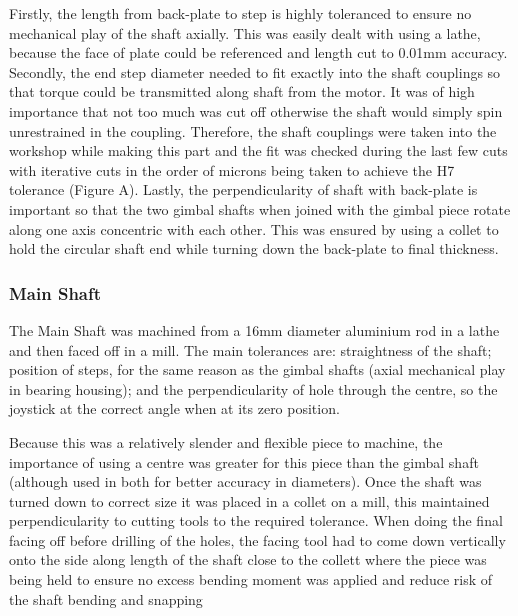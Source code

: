 Firstly, the length from back-plate to step is highly toleranced to ensure no mechanical play of the shaft axially. This was easily dealt with using a lathe, because the face of plate could be referenced and length cut to 0.01mm accuracy.  Secondly, the end step diameter needed to fit exactly into the shaft couplings so that torque could be transmitted along shaft from the motor. It was of high importance that not too much was cut off otherwise the shaft would simply spin unrestrained in the coupling. Therefore, the shaft couplings were taken into the workshop while making this part and the fit was checked during the last few cuts with iterative cuts in the order of microns being taken to achieve the H7 tolerance (Figure A). Lastly, the perpendicularity of shaft with back-plate is important so that the two gimbal shafts when joined with the gimbal piece rotate along one axis concentric with each other. This was ensured by using a collet to hold the circular shaft end while turning down the back-plate to final thickness.

\begin{figure}

\end{figure}


\subsubsection{Main Shaft} %
\label{par:main_shaft}

The Main Shaft was machined from a 16mm diameter aluminium rod in a lathe and then faced off in a mill. The main tolerances are: straightness of the shaft; position of steps, for the same reason as the gimbal shafts (axial mechanical play in bearing housing); and the perpendicularity of hole through the centre, so the joystick at the correct angle when at its zero position.

Because this was a relatively slender and flexible piece to machine, the importance of using a centre was greater for this piece than the gimbal shaft (although used in both for better accuracy in diameters). Once the shaft was turned down to correct size it was placed in a collet on a mill, this maintained perpendicularity to cutting tools to the required tolerance. When doing the final facing off before drilling of the holes, the facing tool had to come down vertically onto the side along length of the shaft close to the collett where the piece was being held to ensure no excess bending moment was applied and reduce risk of the shaft bending and snapping

